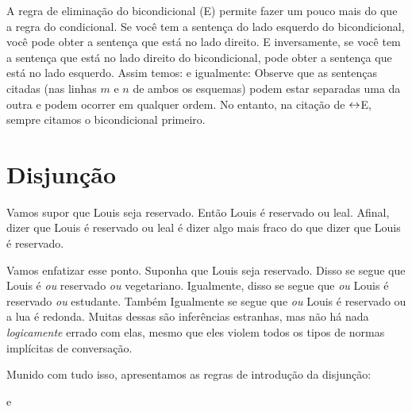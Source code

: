 A regra de eliminação do bicondicional ({\eiff}E) permite fazer um pouco mais do que a regra do condicional.  Se você tem a sentença do lado esquerdo do bicondicional, você pode obter a sentença que está no lado direito. E inversamente, se você tem a sentença que está no lado direito do bicondicional, pode obter a sentença que está no lado esquerdo. Assim temos:
e igualmente:
Observe que as sentenças citadas (nas linhas $m$ e $n$ de ambos os esquemas) podem estar separadas uma da outra e podem ocorrer em qualquer ordem.
 No entanto, na citação de $\leftrightarrow$E, sempre citamos o  bicondicional primeiro.


\section{Disjunção}
Vamos supor que Louis seja reservado.  Então Louis é reservado ou leal. Afinal, dizer que Louis é reservado ou leal é dizer algo mais fraco do que dizer que Louis é reservado. 

Vamos enfatizar esse ponto. Suponha que Louis seja reservado. Disso se segue que  Louis é \emph{ou} reservado \emph{ou} vegetariano.  Igualmente,  disso se segue que \emph{ou} Louis   é reservado \emph{ou} estudante. Também  Igualmente se segue que   \emph{ou} Louis é reservado ou a lua é redonda. Muitas dessas são inferências estranhas, mas não há nada \emph{logicamente} errado com elas, mesmo que eles violem todos os tipos de normas implícitas de conversação.

Munido com tudo isso, apresentamos as regras de introdução da disjunção:

e

